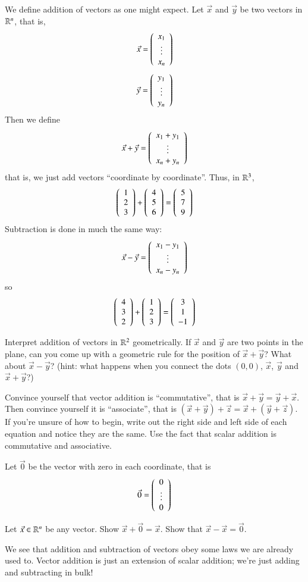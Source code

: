 We define addition of vectors as one might expect.
Let $\vec{x}$ and $\vec{y}$ be two vectors in $\mathbb{R}^n$, that is,
\[\vec{x}=\left(\begin{array}{c}x_1 \\ \vdots \\ x_n\end{array}\right)\]
\[\vec{y}=\left(\begin{array}{c}y_1 \\ \vdots \\ y_n\end{array}\right)\]
Then we define
\[\vec{x}+\vec{y}=\left(\begin{array}{c}x_1+y_1 \\ \vdots \\ x_n+y_n\end{array}\right)\]
that is, we just add vectors ``coordinate by coordinate''.
Thus, in $\mathbb{R}^3$, 
\[\left(\begin{array}{c}1 \\ 2 \\ 3\end{array}\right) + \left(\begin{array}{c}4 \\ 5 \\ 6\end{array}\right) = \left(\begin{array}{c}5\\7\\ 9\end{array}\right)\]
Subtraction is done in much the same way:
\[\vec{x}-\vec{y}=\left(\begin{array}{c}x_1-y_1 \\ \vdots \\ x_n-y_n\end{array}\right)\]
so
\[\left(\begin{array}{c}4 \\ 3 \\ 2\end{array}\right) + \left(\begin{array}{c}1 \\ 2 \\ 3\end{array}\right) = \left(\begin{array}{c}3\\1\\-1\end{array}\right)\]
\begin{Ex}
  Interpret addition of vectors in $\mathbb{R}^2$ geometrically.  
  If $\vec{x}$ and $\vec{y}$ are two points in the plane, can you come up with a geometric rule for the position of $\vec{x}+\vec{y}$?
  What about $\vec{x}-\vec{y}$?  
  (hint: what happens when you connect the dots $(0,0)$, $\vec{x}$, $\vec{y}$ and $\vec{x}+\vec{y}$?)
\end{Ex}
\begin{Ex}
  \label{sec:abgroup-laws}

  Convince yourself that vector addition is ``commutative'', that is $\vec{x}+\vec{y}=\vec{y}+\vec{x}$. 
  Then convince yourself it is ``associate'', that is $(\vec{x}+\vec{y})+\vec{z}=\vec{x}+(\vec{y}+\vec{z})$. 
  If you're unsure of how to begin, write out the right side and left side of each equation and notice they are the same.  
  Use the fact that scalar addition is commutative and associative.  
\end{Ex}

Let $\vec{0}$ be the vector with zero in each coordinate, that is 
\[\vec{0}=\left(\begin{array}{c}0 \\ \vdots \\ 0\end{array}\right)\]
\begin{EasyEx}
  Let $\vec{x}\in \mathbb{R}^n$ be any vector.  Show $\vec{x}+\vec{0} = \vec{x}$.  
  Show that $\vec{x}-\vec{x}=\vec{0}$.
\end{EasyEx}
We see that addition and subtraction of vectors obey some laws we are already used to.
Vector addition is just an extension of scalar addition; we're just adding and subtracting in bulk!


